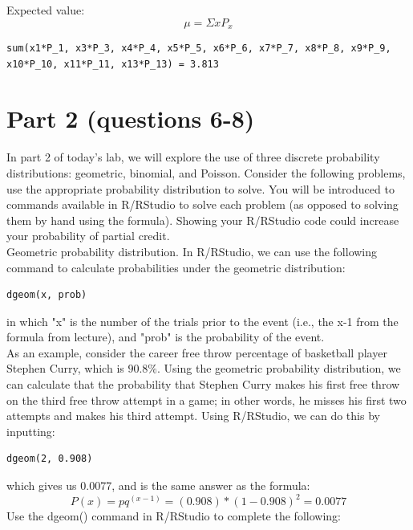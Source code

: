 \documentclass{article}
\begin{document}
Expected value:
\[
 \mu = \Sigma x P_x
\]

\begin{center}
\begin{lstlisting}
sum(x1*P_1, x3*P_3, x4*P_4, x5*P_5, x6*P_6, x7*P_7, x8*P_8, x9*P_9, x10*P_10, x11*P_11, x13*P_13) = 3.813
\end{lstlisting}
\end{center}
 
\section{Part 2 (questions 6-8)}


In part 2 of today’s lab, we will explore the use of three discrete probability distributions: geometric, binomial, and Poisson. Consider the following problems, use the appropriate probability distribution to solve. You will be introduced to commands available in R/RStudio to solve each problem (as opposed to solving them by hand using the formula). Showing your R/RStudio code could increase your probability of partial credit.\\

Geometric probability distribution. In R/RStudio, we can use the following command to calculate probabilities under the geometric distribution:
\begin{center}
\begin{lstlisting}
dgeom(x, prob)
\end{lstlisting}
\end{center}
in which "x" is the number of the trials prior to the event (i.e., the x-1 from the formula from lecture), and "prob" is the probability of the event.\\

As an example, consider the career free throw percentage of basketball player Stephen Curry, which is $90.8\%$. Using the geometric probability distribution, we can calculate that the probability that Stephen Curry makes his first free throw on the third free throw attempt in a game; in other words, he misses his first two attempts and makes his third attempt. Using R/RStudio, we can do this by inputting:\\
\begin{center}
\begin{lstlisting}
dgeom(2, 0.908)
\end{lstlisting}
\end {center}
which gives us 0.0077, and is the same answer as the formula:
\[
P(x) = pq^{\left(x-1\right)} = (0.908)*(1-0.908)^2 = 0.0077
\]
Use the dgeom() command in R/RStudio to complete the following:\\
\end{document}
